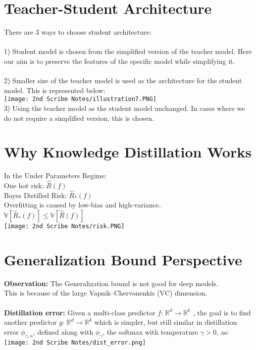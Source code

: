 \documentclass[12pt]{article}
\begin{document}
    \section{Teacher-Student Architecture}
    There are 3 ways to choose student architecture:\\
    \\
    1) Student model is chosen from the simplified version of the teacher model. Here our aim is to preserve the features of the specific model while simplifying it.\\
    \\
    2) Smaller size of the teacher model is used as the architecture for the student model. This is represented below:
    \\
    \texttt{[image: 2nd Scribe Notes/illustration7.PNG]}
    \\
    3) Using the teacher model as the student model unchanged. In cases where we do not require a simplified version, this is chosen.
    
    \section{Why Knowledge Distillation Works}
        In the Under Parameters Regime: \\
        One hot risk: $\hat{R}(f)$ \\
        Bayes Distilled Risk: $\hat{R}_*(f)$ \\
        Overfitting is caused by low-bias and high-variance. \\
        $\mathbb{V}[\hat{R}_*(f)] \le \mathbb{V}[\hat{R}(f)]$ \\
        \texttt{[image: 2nd Scribe Notes/risk.PNG]} \\
        
    \section{Generalization Bound Perspective}
        \textbf{Observation:} The Generalization bound is not good for deep models. \\
        This is because of the large  Vapnik–Chervonenkis (VC) dimension. \\
        \\
        \textbf{Distillation error:} Given a multi-class predictor $f$: $\mathbb{R}^d \rightarrow \mathbb{R}^k$ , the goal is to find another predictor $g$: $\mathbb{R}^d \rightarrow \mathbb{R}^k$ which is simpler, but still similar in distillation error $\phi_{\gamma,n}$, defined along with $\phi_\gamma$, the softmax with temperature $\gamma > 0$, as: \\
        \texttt{[image: 2nd Scribe Notes/dist\_error.png]} \\
        
\end{document}
